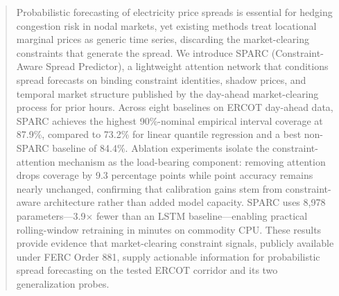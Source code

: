 \documentclass[twoside]{article}
\begin{document}

\begin{abstract}
Probabilistic forecasting of electricity price spreads is essential for hedging congestion risk in nodal markets, yet existing methods treat locational marginal prices as generic time series, discarding the market-clearing constraints that generate the spread. We introduce SPARC (Constraint-Aware Spread Predictor), a lightweight attention network that conditions spread forecasts on binding constraint identities, shadow prices, and temporal market structure published by the day-ahead market-clearing process for prior hours. Across eight baselines on ERCOT day-ahead data, SPARC achieves the highest 90\%-nominal empirical interval coverage at 87.9\%, compared to 73.2\% for linear quantile regression and a best non-SPARC baseline of 84.4\%. Ablation experiments isolate the constraint-attention mechanism as the load-bearing component: removing attention drops coverage by 9.3 percentage points while point accuracy remains nearly unchanged, confirming that calibration gains stem from constraint-aware architecture rather than added model capacity. SPARC uses 8,978 parameters---3.9$\times$ fewer than an LSTM baseline---enabling practical rolling-window retraining in minutes on commodity CPU. These results provide evidence that market-clearing constraint signals, publicly available under FERC Order 881, supply actionable information for probabilistic spread forecasting on the tested ERCOT corridor and its two generalization probes.
\end{abstract}
\end{document}
